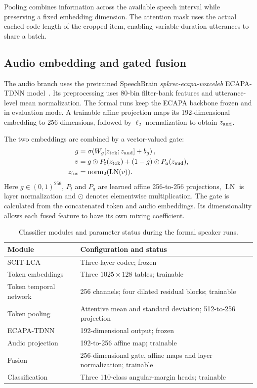 Pooling combines information across the available speech interval while preserving a fixed embedding dimension. The attention mask uses the actual cached code length of the cropped item, enabling variable-duration utterances to share a batch.

\subsection{Audio embedding and gated fusion}
The audio branch uses the pretrained SpeechBrain \textit{spkrec-ecapa-voxceleb} ECAPA-TDNN model~\cite{ecapa}. Its preprocessing uses 80-bin filter-bank features and utterance-level mean normalization. The formal runs keep the ECAPA backbone frozen and in evaluation mode. A trainable affine projection maps its 192-dimensional embedding to 256 dimensions, followed by $\ell_2$ normalization to obtain $z_{\rm aud}$.

The two embeddings are combined by a vector-valued gate:
\begin{align}
 g&=\sigma\!\left(W_g[z_{\rm tok};z_{\rm aud}]+b_g\right),
 \nonumber\\
 v&=g\odot P_t(z_{\rm tok})+(1-g)\odot P_a(z_{\rm aud}),
 \nonumber\\
 z_{\rm fus}&=\operatorname{norm}_2(\operatorname{LN}(v)).
 \label{eq:sv2-gate}
\end{align}
Here $g\in(0,1)^{256}$, $P_t$ and $P_a$ are learned affine 256-to-256 projections, $\operatorname{LN}$ is layer normalization and $\odot$ denotes elementwise multiplication. The gate is calculated from the concatenated token and audio embeddings. Its dimensionality allows each fused feature to have its own mixing coefficient.

\begin{table}[t]
\centering
\caption{Classifier modules and parameter status during the formal speaker runs.}
\label{tab:sv2-speaker-modules}
\small
\begin{tabularx}{\columnwidth}{@{}YY@{}}
\toprule
Module & Configuration and status\\
\midrule
SCIT-LCA & Three-layer codec; frozen\\
Token embeddings & Three $1025\times128$ tables; trainable\\
Token temporal network & 256 channels; four dilated residual blocks; trainable\\
Token pooling & Attentive mean and standard deviation; 512-to-256 projection\\
ECAPA-TDNN & 192-dimensional output; frozen\\
Audio projection & 192-to-256 affine map; trainable\\
Fusion & 256-dimensional gate, affine maps and layer normalization; trainable\\
Classification & Three 110-class angular-margin heads; trainable\\
\bottomrule
\end{tabularx}
\end{table}

